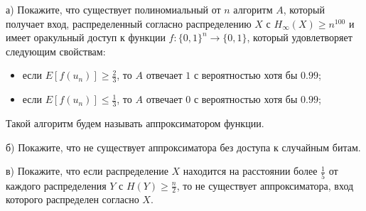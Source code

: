 \begin{ptask}{27}
    а) Покажите, что существует полиномиальный от $n$ алгоритм $A$, который получает вход, распределенный согласно распределению
    $X$ с $H_{\infty}(X) \ge n^{100}$ и имеет оракульный доступ к функции $f: \{0, 1\}^n \rightarrow \{0, 1\}$, который
    удовлетворяет следующим свойствам:
    \begin{itemize}
        \item если $E[f(u_n)] \ge \frac{2}{3}$, то $A$ отвечает $1$ с вероятностью хотя бы $0.99$;
        \item если $E[f(u_n)] \le \frac{1}{3}$, то $A$ отвечает $0$ с вероятностью хотя бы $0.99$;
	\end{itemize}

    Такой алгоритм будем называть аппроксиматором функции.

    б) Покажите, что не существует аппроксиматора без доступа к случайным битам.

    в) Покажите, что если распределение $X$ находится на расстоянии более $\frac{1}{5}$ от каждого распределения $Y$ с $H(Y) \ge
    \frac{n}{2}$, то не существует аппроксиматора, вход которого распределен согласно $X$.
\end{ptask}
